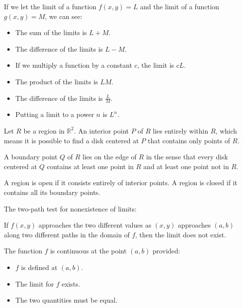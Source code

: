 \documentclass[../calc3.tex]{subfiles}
\begin{document}
If we let the limit of a function $f(x,y)=L$ and the limit of a function $g(x,y) = M$, we can see:
\begin{itemize}
    \item The sum of the limits is $L+M$.
    \item The difference of the limits is $L-M$.
    \item If we multiply a function by a constant $c$, the limit is $cL$.
    \item The product of the limits is $LM$.
    \item The difference of the limits is $\frac{L}{M}$.
    \item Putting a limit to a power $n$ is $L^n$.
\end{itemize}

\begin{definition}
    Let $R$ be a region in $\mathbb{R}^2$. An interior point $P$ of $R$ lies entirely within $R$, which
    means it is possible to find a disk centered at $P$ that contains only points of $R$.

    A boundary point $Q$ of $R$ lies on the edge of $R$ in the sense that every disk centered at $Q$
    contains at least one point in $R$ and at least one point not in $R$.
\end{definition}

\begin{definition}
    A region is open if it consists entirely of interior points. A region is closed if it contains all its boundary points.
\end{definition}

The two-path test for nonexistence of limits:

If $f(x,y)$ approaches the two different values as $(x,y)$ approaches $(a,b)$ along two different paths in the domain of $f$,
then the limit does not exist.

\begin{definition}
    The function $f$ is continuous at the point $(a,b)$ provided:
    \begin{itemize}
        \item $f$ is defined at $(a,b)$.
        \item The limit for $f$ exists.
        \item The two quantities must be equal.
    \end{itemize}
    
\end{definition}
\end{document}
